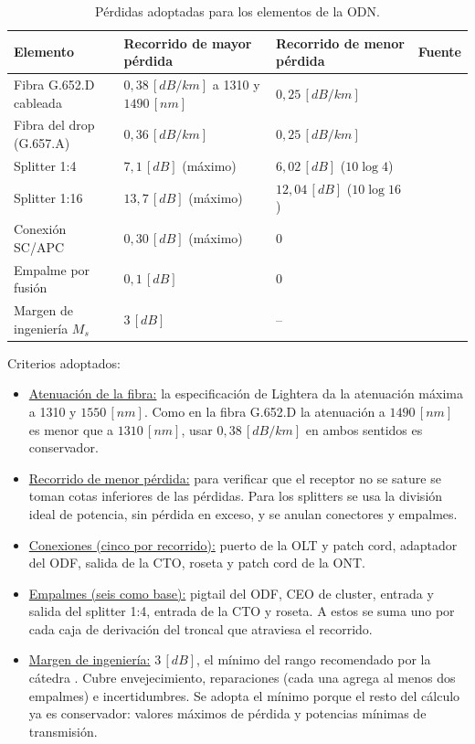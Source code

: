 \begin{table}[H]
    \centering
    \footnotesize
    \caption{Pérdidas adoptadas para los elementos de la ODN.}
    \label{tab:param_odn}
    \begin{tabular}{|l|p{3.6cm}|p{3.6cm}|l|}
        \hline
        \textbf{Elemento} & \textbf{Recorrido de mayor pérdida} & \textbf{Recorrido de menor pérdida} & \textbf{Fuente} \\
        \hline
        Fibra G.652.D cableada & $0{,}38 \, [dB/km]$ a 1310 y $1490 \, [nm]$ & $0{,}25 \, [dB/km]$ & \cite{et_minira} \\
        Fibra del drop (G.657.A) & $0{,}36 \, [dB/km]$ & $0{,}25 \, [dB/km]$ & \cite{et_drop} \\
        Splitter 1:4 & $7{,}1 \, [dB]$ (máximo) & $6{,}02 \, [dB]$ ($10 \log 4$) & \cite{et_splitter} \\
        Splitter 1:16 & $13{,}7 \, [dB]$ (máximo) & $12{,}04 \, [dB]$ ($10 \log 16$) & \cite{et_splitter} \\
        Conexión SC/APC & $0{,}30 \, [dB]$ (máximo) & $0$ & \cite{et_splitter} \\
        Empalme por fusión & $0{,}1 \, [dB]$ & $0$ & \cite{libro_presupuesto} \\
        Margen de ingeniería $M_s$ & $3 \, [dB]$ & -- & \cite{libro_presupuesto} \\
        \hline
    \end{tabular}
\end{table}

Criterios adoptados:
\begin{itemize}
    \item \underline{Atenuación de la fibra:} la especificación de Lightera da la atenuación máxima a 1310 y $1550 \, [nm]$. Como en la fibra G.652.D la atenuación a $1490 \, [nm]$ es menor que a $1310 \, [nm]$, usar $0{,}38 \, [dB/km]$ en ambos sentidos es conservador.
    \item \underline{Recorrido de menor pérdida:} para verificar que el receptor no se sature se toman cotas inferiores de las pérdidas. Para los splitters se usa la división ideal de potencia, sin pérdida en exceso, y se anulan conectores y empalmes.
    \item \underline{Conexiones (cinco por recorrido):} puerto de la OLT y patch cord, adaptador del ODF, salida de la CTO, roseta y patch cord de la ONT.
    \item \underline{Empalmes (seis como base):} pigtail del ODF, CEO de cluster, entrada y salida del splitter 1:4, entrada de la CTO y roseta. A estos se suma uno por cada caja de derivación del troncal que atraviesa el recorrido.
    \item \underline{Margen de ingeniería:} $3 \, [dB]$, el mínimo del rango recomendado por la cátedra \cite{libro_presupuesto}. Cubre envejecimiento, reparaciones (cada una agrega al menos dos empalmes) e incertidumbres. Se adopta el mínimo porque el resto del cálculo ya es conservador: valores máximos de pérdida y potencias mínimas de transmisión.
\end{itemize}

